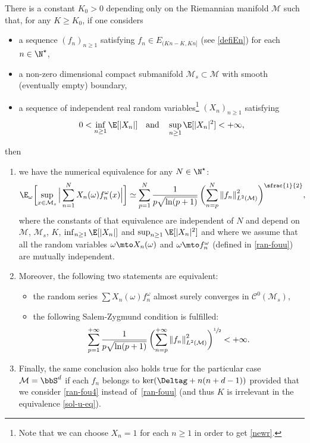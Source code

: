 \begin{theo}\label{sol-u}
There is a constant $K_0>0$ depending only on the Riemannian manifold $\mathcal{M}$ such that, for any $K\geq K_0$, if one considers
\begin{itemize}
\item a sequence $(f_n)_{n\geq 1}$ satisfying $f_n\in E_{(Kn-K,Kn]}$ (see \eqref{defiEn}) for each $n\in \N^\star$,
\item a non-zero dimensional compact submanifold $\mathcal{M}_s\subset \mathcal{M}$ with smooth (eventually empty) boundary,
\item a sequence of independent real random variables\footnote{Note that we can choose $X_n=1$ for each $n\geq 1$ in order to get \eqref{newr}.} $(X_n)_{n\geq 1}$ satisfying
\begin{equation}\label{hyp-Xn}
0<\inf_{n\geq 1}\E[|X_n|] \quad \text{and}\quad \sup_{n\geq 1}\E[|X_n|^2]<+\infty,
\end{equation}
\end{itemize}
\pagebreak[2]
then
\begin{enumerate}
\item we have the numerical equivalence for any $N\in \N^\star$:\vspace*{-3pt}
\begin{equation}\label{sol-u-eq}
\E_{\omega}\biggl[\sup_{x\in \mathcal{M}_s}\Big| \sum_{n=1}^{N} X_n(\omega) f_n^{\omega}(x) \Big| \biggr] \simeq \sum_{p=1}^N \frac{1}{p\sqrt{\ln(p+1)}}\,\biggl(\sum_{n=p}^N \left\Vert f_n\right\Vert_{L^2(\mathcal{M})}^2 \biggr)^{\sfrac{1}{2}},
\end{equation}
where the constants of that equivalence are independent of $N$ and depend on $\mathcal{M}$, $\mathcal{M}_s$, $K$, $\inf_{n\geq 1} \E[|X_n|]$ and $\sup_{n\geq 1} \E[|X_n|^2]$
and where we assume that all the random variables $\omega\mto X_n(\omega)$ and $\omega\mto f_n^\omega$ (defined in \eqref{ran-fouu}) are mutually independent.

\item Moreover, the following two statements are equivalent:
\begin{itemize}
\item the random series $\sum X_n(\omega)f_n^{\omega}$ almost surely converges in $\mathcal{C}^0(\mathcal{M}_s)$,
\item the following Salem-Zygmund condition is fulfilled:\vspace*{-3pt}
\begin{equation}\label{pz-con30}
\sum_{p=1}^{+\infty} \frac{1}{p\sqrt{\ln(p+1)}}\,\biggl(\sum_{n=p}^{+\infty} \left\Vert f_n\right\Vert_{L^2(\mathcal{M})}^2 \biggr)^{\sfrac{1}{2}}<+\infty.
\end{equation}
\end{itemize}
\item Finally, the same conclusion also holds true for the particular case $\mathcal{M}=\bbS^d$ if each $f_n$ belongs to $\ker(\Deltag+n(n+d-1))$
provided that we consider \eqref{ran-fou4} instead of~\eqref{ran-fouu} (and thus $K$ is irrelevant in the equivalence \eqref{sol-u-eq}).
\end{enumerate}
\end{theo}
